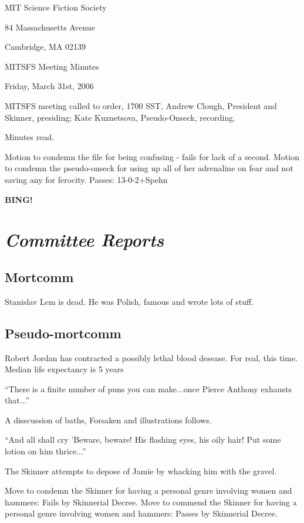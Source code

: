 \documentclass[10pt]{article}
\newcommand{\bing}{{\bf BING!} }
\newcommand{\goto}[1]{\bing \vskip 12pt \section*{{\em{#1}}}}
\begin{document}
\begin{center}

MIT Science Fiction Society

84 Massachusetts Avenue

Cambridge, MA 02139

\vspace{12pt}

MITSFS Meeting Minutes

Friday, March 31st, 2006

\end{center}

\vspace{18pt}

\setlength{\parskip}{6pt}

\noindent
MITSFS meeting called to order, 1700 SST,
Andrew Clough, President and Skinner, presiding; Kate Kuznetsova, Pseudo-Onseck, recording.

Minutes read.

Motion to condemn the file for being confusing - fails for lack of a second.
Motion to condemn the pseudo-onseck for  using up all of her adrenaline on fear and not saving any for ferocity. Passes: 13-0-2+Spehn

\goto{Committee Reports}

\subsection*{Mortcomm}
Stanislav Lem is dead. He was Polish, famous and wrote lots of stuff. 

\subsection*{Pseudo-mortcomm}
Robert Jordan has contracted a possibly lethal blood desease. For real, this time. Median life expectancy is 5 years

``There is a finite number of puns you can make...once Pierce Anthony exhausts that...''

A disscussion of baths, Forsaken and illustrations follows.

``And all shall cry 'Beware, beware! His flashing eyes, his oily hair! Put some lotion on him thrice...''

The Skinner attempts to depose of Jamie by whacking him with the gravel.

Move to condemn the Skinner for having a personal genre involving women and hammers: Fails by Skinnerial Decree.
Move to commend the Skinner for having a personal genre involving women and hammers: Passes by Skinnerial Decree.
\end{document}
